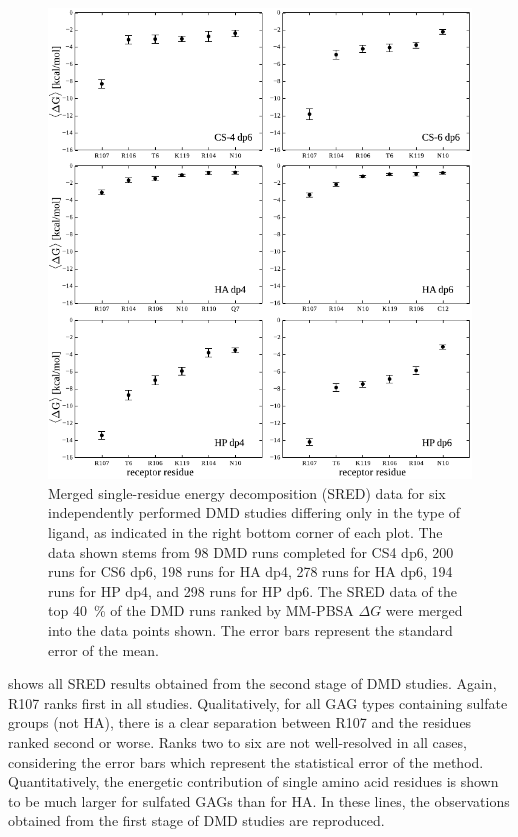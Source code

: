 \begin{figure}
\centering
\includegraphics[width=1.0\textwidth]{gfx/dmdil10/second_stage_all_SREDs_05.pdf}
\caption[]{
Merged single-residue energy decomposition (SRED) data for six independently
performed DMD studies differing only in the type of ligand, as indicated in the
right bottom corner of each plot. The data shown stems from 98 DMD runs
completed for CS4 dp6, 200 runs for CS6 dp6, 198 runs for HA dp4, 278 runs for
HA dp6, 194 runs for HP dp4, and 298 runs for HP dp6. The SRED data of the top
\SI{40}{\percent} of the DMD runs ranked by MM-PBSA $\Delta G$ were merged into
the data points shown. The error bars represent the standard error of the mean.
}
\label{fig:dmdil10:2nd_stage_all_SREDs}
\end{figure}

 shows all SRED results obtained from the
second stage of DMD studies. Again, R107 ranks first in all studies.
Qualitatively, for all GAG types containing sulfate groups (not HA), there is a
clear separation between R107 and the residues ranked second or worse. Ranks two
to six are not well-resolved in all cases, considering the error bars which
represent the statistical error of the method. Quantitatively, the energetic
contribution of single amino acid residues is shown to be much larger for
sulfated GAGs than for HA. In these lines, the observations obtained from the
first stage of DMD studies are reproduced.

